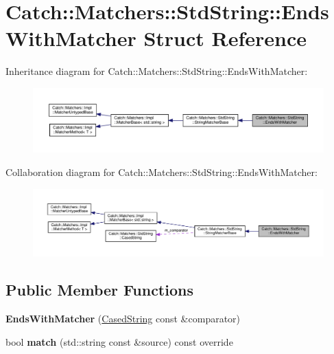 \hypertarget{structCatch_1_1Matchers_1_1StdString_1_1EndsWithMatcher}{}\section{Catch\+:\+:Matchers\+:\+:Std\+String\+:\+:Ends\+With\+Matcher Struct Reference}
\label{structCatch_1_1Matchers_1_1StdString_1_1EndsWithMatcher}


Inheritance diagram for Catch\+:\+:Matchers\+:\+:Std\+String\+:\+:Ends\+With\+Matcher\+:
\nopagebreak
\begin{figure}[H]
\begin{center}
\leavevmode
\includegraphics[width=350pt]{structCatch_1_1Matchers_1_1StdString_1_1EndsWithMatcher__inherit__graph}
\end{center}
\end{figure}


Collaboration diagram for Catch\+:\+:Matchers\+:\+:Std\+String\+:\+:Ends\+With\+Matcher\+:
\nopagebreak
\begin{figure}[H]
\begin{center}
\leavevmode
\includegraphics[width=350pt]{structCatch_1_1Matchers_1_1StdString_1_1EndsWithMatcher__coll__graph}
\end{center}
\end{figure}
\subsection*{Public Member Functions}
\begin{DoxyCompactItemize}
\item 
\mbox{\label{structCatch_1_1Matchers_1_1StdString_1_1EndsWithMatcher_aa5ec700b4629562f74f362080accfd7b}} 
{\bfseries Ends\+With\+Matcher} (\hyperlink{structCatch_1_1Matchers_1_1StdString_1_1CasedString}{Cased\+String} const \&comparator)
\item 
\mbox{\label{structCatch_1_1Matchers_1_1StdString_1_1EndsWithMatcher_aca2741fa57374a2a98d2a84ac3e13a6d}} 
bool {\bfseries match} (std\+::string const \&source) const override
\end{DoxyCompactItemize}
